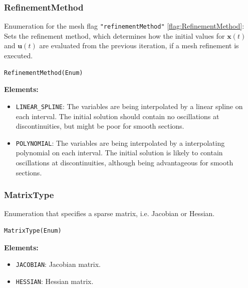\documentclass[12pt]{article}
\renewcommand{\v}{\bm}
\begin{document}
\subsubsection{RefinementMethod}

\begin{mdframed}[backgroundcolor=gray!10, roundcorner=10pt,
		linewidth=1pt]
	Enumeration for the mesh flag \texttt{"refinementMethod"}
	\ref{flag:RefinementMethod}:
	Sets the refinement method, which determines how the initial values for
	$\v{x}(t)$ and $\v{u}(t)$ are evaluated from the previous iteration, if
	a mesh refinement is executed.

	\begin{lstlisting}
RefinementMethod(Enum)
	\end{lstlisting}
	\label{enum:RefinementMethod}
	\textbf{Elements:}
	\begin{itemize}
		\item \texttt{LINEAR\_SPLINE}: The variables are being
		      interpolated by a linear spline on each interval. The
		      initial solution
		      should contain no oscillations at discontinuities, but
		      might be poor for smooth
		      sections.
		\item \texttt{POLYNOMIAL}: The variables are being
		      interpolated by a interpolating polynomial on each
		      interval.
		      The initial solution
		      is likely to contain oscillations at discontinuities,
		      although
		      being advantageous for smooth
		      sections.
	\end{itemize}

\end{mdframed}

\subsubsection{MatrixType}
\label{c:MatrixType}
\begin{mdframed}[backgroundcolor=gray!10, roundcorner=10pt,
	linewidth=1pt]
	Enumeration that specifies a sparse matrix, i.e. Jacobian or Hessian.
	
	\begin{lstlisting}
MatrixType(Enum)
	\end{lstlisting}
	\label{enum:MatrixType}
	\textbf{Elements:}
	\begin{itemize}
		\item \texttt{JACOBIAN}: Jacobian matrix.
		\item \texttt{HESSIAN}: Hessian matrix.
	\end{itemize}
	
\end{mdframed}
\end{document}
